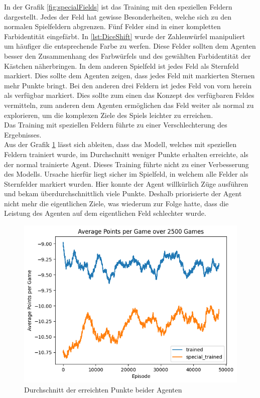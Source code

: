 In der Grafik \ref{fig:specialFields} ist das Training mit den speziellen Feldern dargestellt. Jedes der Feld hat gewisse Besonderheiten, welche sich zu den normalen Spielfeldern abgrenzen.
Fünf Felder sind in einer kompletten Farbidentität eingefärbt. In \ref{lst:DiceShift} wurde der Zahlenwürfel manipuliert um häufiger die entsprechende Farbe zu werfen. Diese Felder sollten dem Agenten besser den Zusammenhang des Farbwürfels und des gewählten Farbidentität der Kästchen näherbringen.
In dem anderen Spielfeld ist jedes Feld als Sternfeld markiert. Dies sollte dem Agenten zeigen, dass jedes Feld mit markierten Sternen mehr Punkte bringt.
Bei den anderen drei Feldern ist jedes Feld von vorn herein als verfügbar markiert. Dies sollte zum einen das Konzept des verfügbaren Feldes vermitteln, zum anderen dem Agenten ermöglichen das Feld weiter als normal zu explorieren, um die komplexen Ziele des Spiels leichter zu erreichen. \\
Das Training mit speziellen Feldern führte zu einer Verschlechterung des Ergebnisses. \\
Aus der Grafik \ref{fig:special_points} lässt sich ableiten, dass das Modell, welches mit speziellen Feldern trainiert wurde, im Durchschnitt weniger Punkte erhalten erreichte, als der normal trainierte Agent. Dieses Training führte nicht zu einer Verbesserung des Modells. Ursache hierfür liegt sicher im Spielfeld, in welchem alle Felder als Sternfelder markiert wurden. Hier konnte der Agent willkürlich Züge ausführen und bekam überdurchschnittlich viele Punkte. Deshalb priorisierte der Agent nicht mehr die eigentlichen Ziele, was wiederum zur Folge hatte, dass die Leistung des Agenten auf dem eigentlichen Feld schlechter wurde. 

\begin{figure}[!h]
    \centering
    \includegraphics[scale=0.6]{Bilder/points_special_trained.png}
    \caption{Durchschnitt der erreichten Punkte beider Agenten}
    \label{fig:special_points}
\end{figure}

